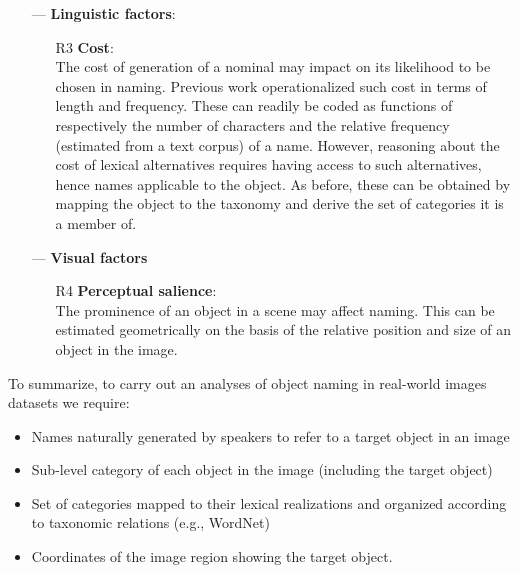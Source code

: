 \begin{itemize}
\begin{itemize}
	\end{itemize}
	\item[---] \textbf{Linguistic factors}:
	\begin{itemize}
		\item[R3] \textbf{Cost}: \\
		The cost of generation of a nominal may impact on its likelihood to be chosen in naming. Previous work \cite{graf2016animal} operationalized such cost in terms of length and frequency. These can readily be coded as functions of respectively the number of characters and the relative frequency (estimated from a text corpus) of a name.  However, reasoning about the cost of lexical alternatives requires having access to such alternatives, hence names applicable to the object. As before, these can be obtained by mapping the object to the taxonomy and derive the set of categories it is a member of.
	\end{itemize}
	\item[---] \textbf{Visual factors}
	\begin{itemize}
		\item[R4] \textbf{Perceptual salience}: \\
		The prominence of an object in a scene may affect naming.	This can be estimated geometrically on the basis of the relative position and size of an object in the image.
	\end{itemize}
\end{itemize}
%
To summarize, to carry out an analyses of object naming in real-world images datasets we require:
\begin{itemize}
	\item Names naturally generated by speakers to refer to a target object in an image
	\item Sub-level category of each object in the image (including the target object)
	\item Set of categories mapped to their lexical realizations and organized according to taxonomic relations (e.g., WordNet)
	\item Coordinates of the image region showing the target object.
\end{itemize}
